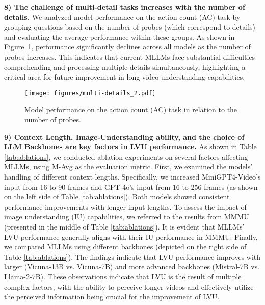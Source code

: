 \textbf{8) The challenge of multi-detail tasks increases with the number of details.} We analyzed model performance on the action count (AC) task by grouping questions based on the number of probes (which correspond to details) and evaluating the average performance within these groups. As shown in Figure~\ref{fig:multi_detail_num}, performance significantly declines across all models as the number of probes increases. This indicates that current MLLMs face substantial difficulties comprehending and processing multiple details simultaneously, highlighting a critical area for future improvement in long video understanding capabilities.

\begin{figure}[t]
    \centering
    \texttt{[image: figures/multi-details\_2.pdf]}
    \vspace{-0.2cm}
    \caption{Model performance on the action count (AC) task in relation to the number of probes.}  
    \vspace{-0.5cm}
    \label{fig:multi_detail_num}
\end{figure}

\textbf{{9) Context Length, Image-Understanding ability, and the choice of LLM Backbones are key factors in LVU performance.}} As shown in Table \ref{tab:ablations}, we conducted ablation experiments on several factors affecting MLLMs, using M-Avg as the evaluation metric. First, we examined the models' handling of different context lengths. Specifically, we increased MiniGPT4-Video's input from 16 to 90 frames and GPT-4o's input from 16 to 256 frames (as shown on the left side of Table \ref{tab:ablations}). Both models showed consistent performance improvements with longer input lengths. To assess the impact of image understanding (IU) capabilities, we referred to the results from MMMU \cite{yue2023mmmu} (presented in the middle of Table \ref{tab:ablations}). It is evident that MLLMs' LVU performance generally aligns with their IU performance in MMMU. Finally, we compared MLLMs using different backbones (depicted on the right side of Table \ref{tab:ablations}). The findings indicate that LVU performance improves with larger (Vicuna-13B vs. Vicuna-7B) and more advanced backbones (Mistral-7B vs. Llama-2-7B). These observations indicate that LVU is the result of multiple complex factors, with the ability to perceive longer videos and effectively utilize the perceived information being crucial for the improvement of LVU. 
\vspace{-0.2cm}
